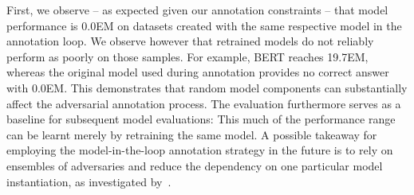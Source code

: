 \documentclass[11pt,a4paper]{article}
\begin{document}
First, we observe -- as expected given our annotation constraints -- that model performance is 0.0EM on datasets created with the same respective model in the annotation loop. 
We observe however that retrained models do not reliably perform as poorly on those samples.
For example, BERT reaches 19.7EM, whereas the original model used during annotation provides no correct answer with 0.0EM.
This demonstrates that random model components can substantially affect the adversarial annotation process.
The evaluation furthermore serves as a baseline for subsequent model evaluations: This much of the performance range can be learnt merely by retraining the same model.
A possible takeaway for employing the model-in-the-loop annotation strategy in the future is to rely on ensembles of adversaries and reduce the dependency on one particular model instantiation, as investigated by~\citet{DBLP:journals/corr/abs-1811-09300}.
\end{document}
